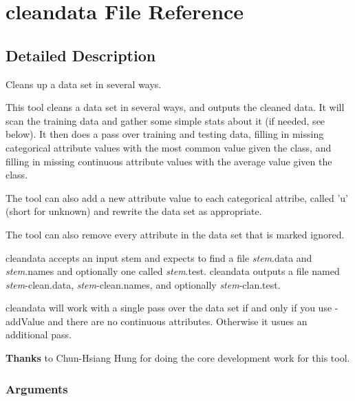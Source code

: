 \section{cleandata File Reference}
\label{cleandata}


\subsection{Detailed Description}
Cleans up a data set in several ways. 

This tool cleans a data set in several ways, and outputs the cleaned data. It will scan the training data and gather some simple stats about it (if needed, see below). It then does a pass over training and testing data, filling in missing categorical attribute values with the most common value given the class, and filling in missing continuous attribute values with the average value given the class.

The tool can also add a new attribute value to each categorical attribe, called 'u' (short for unknown) and rewrite the data set as appropriate.

The tool can also remove every attribute in the data set that is marked ignored.

cleandata accepts an input stem and expects to find a file {\em stem\/}.data and {\em stem\/}.names and optionally one called {\em stem\/}.test. cleandata outputs a file named {\em stem\/}-clean.data, {\em stem\/}-clean.names, and optionally {\em stem\/}-clan.test.

cleandata will work with a single pass over the data set if and only if you use -add\-Value and there are no continuous attributes. Otherwise it usues an additional pass.

\begin{Desc}
\item[{\bf Thanks}]to Chun-Hsiang Hung for doing the core development work for this tool. \end{Desc}
\subsubsection*{Arguments}


